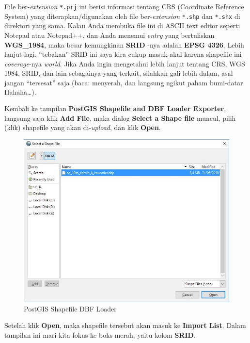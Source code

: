 \documentclass[]{book}
\begin{document}
\begin{itemize}
  File ber-\emph{extension} \texttt{*.prj} ini berisi informasi tentang CRS (Coordinate Reference System) yang diterapkan/digunakan oleh file ber-\emph{extension} \texttt{*.shp} dan \texttt{*.shx} di direktori yang sama. Kalau Anda membuka file ini di ASCII text editor seperti Notepad atau Notepad++, dan Anda menemui \emph{entry} yang bertuliskan \textbf{WGS\_1984}, maka besar kemungkinan \textbf{SRID} -nya adalah \textbf{EPSG 4326}. Lebih lanjut lagi, ``tebakan'' SRID ini saya kira cukup masuk-akal karena shapefile ini \emph{coverage}-nya \emph{world}. Jika Anda ingin mengetahui lebih lanjut tentang CRS, WGS 1984, SRID, dan lain sebagainya yang terkait, silahkan gali lebih dalam, asal jangan ``tersesat'' saja (baca: menyerah, dan langsung ngikut paham bumi-datar. Hahaha\ldots{}).

  Kembali ke tampilan \textbf{PostGIS Shapefile and DBF Loader Exporter}, langsung saja klik \textbf{Add File}, maka dialog \textbf{Select a Shape file} muncul, pilih (klik) shapefile yang akan di-\emph{upload}, dan klik \textbf{Open}.

  \begin{figure}
  \centering
  \includegraphics{./img/postgis-loader-select-shapefile-box.jpg}
  \caption{PostGIS Shapefile DBF Loader}
  \end{figure}

  Setelah klik \textbf{Open}, maka shapefile tersebut akan masuk ke \textbf{Import List}. Dalam tampilan ini mari kita fokus ke boks merah, yaitu kolom \textbf{SRID}.


\end{itemize}
\end{document}
